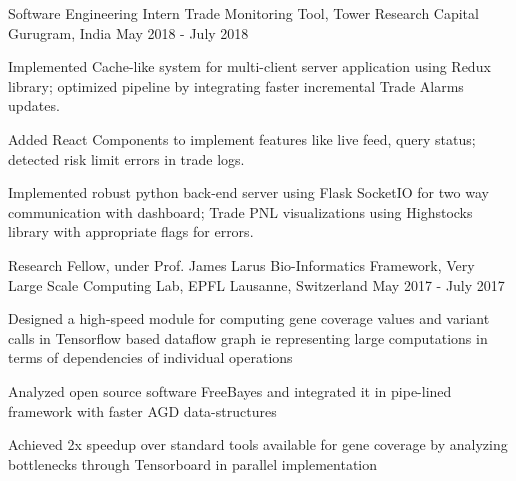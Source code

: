 

\begin{cventries}

  \cventry
    {Software Engineering Intern} %
    {Trade Monitoring Tool, Tower Research Capital} %
    {Gurugram, India} %
    {May 2018 - July 2018} %
    {
      \begin{cvitems} %
        \item {Implemented Cache-like system for multi-client server application using Redux library; optimized pipeline by integrating faster incremental Trade Alarms updates.}
        \item {Added React Components to implement features like live feed, query status; detected risk limit errors in trade logs.}
        \item {Implemented robust python back-end server using Flask SocketIO for two way communication with dashboard; Trade PNL visualizations using Highstocks library with appropriate flags for errors.}
      \end{cvitems}
    }

  \cventry
    {Research Fellow, under Prof. James Larus } %
    {Bio-Informatics Framework, Very Large Scale Computing Lab, EPFL} %
    {Lausanne, Switzerland} %
    {May 2017 - July 2017} %
    {
      \begin{cvitems} %
        \item {Designed a high-speed module for computing gene coverage values and variant calls in Tensorflow based dataflow graph ie representing large computations in terms of dependencies of individual operations}
        \item {Analyzed open source software FreeBayes and integrated it in pipe-lined framework with faster AGD data-structures}
        \item {Achieved 2x speedup over standard tools available for gene coverage by analyzing bottlenecks through Tensorboard in parallel implementation}
      \end{cvitems}
    }

\end{cventries}

